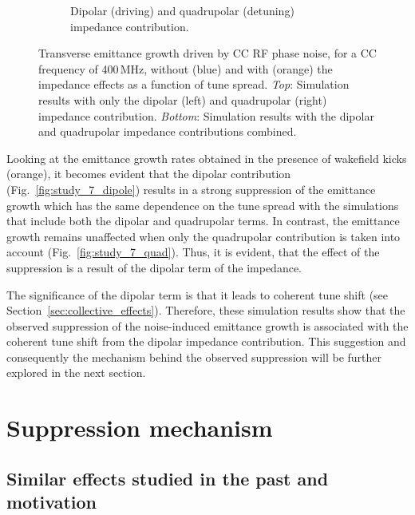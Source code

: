 \begin{figure}[htp]
\begin{subfigure}{.45\textwidth}
        \caption{Dipolar (driving) and quadrupolar (detuning) impedance contribution.}
        \label{fig:study_7_dipole_and_quad}
    \end{subfigure}   
    \caption{Transverse emittance growth driven by CC RF phase noise, for a CC frequency of 400\,MHz, without (blue) and with (orange) the impedance effects as a function of tune spread. \textit{Top}: Simulation results with only the dipolar (left) and quadrupolar (right) impedance contribution. \textit{Bottom}: Simulation results with the dipolar and quadrupolar impedance contributions combined.}
    \label{fig:study_7_dipole_vs_quadrupole}
\end{figure}

Looking at the emittance growth rates obtained in the presence of wakefield kicks (orange), it becomes evident that the dipolar contribution (Fig.~\ref{fig:study_7_dipole}) results in a strong suppression of the emittance growth which has the same dependence on the tune spread with the simulations that include both the dipolar and quadrupolar terms. In contrast, the emittance growth remains unaffected when only the quadrupolar contribution is taken into account (Fig.~\ref{fig:study_7_quad}). Thus, it is evident, that the effect of the suppression is a result of the dipolar term of the impedance. 

The significance of the dipolar term is that it leads to coherent tune shift (see Section~\ref{sec:collective_effects}). Therefore, these simulation results show that the observed suppression of the noise-induced emittance growth is associated with the coherent tune shift from the dipolar impedance contribution. This suggestion and consequently the mechanism behind the observed suppression will be further explored in the next section.


\section{Suppression mechanism}\label{sec:suppression_mechanism}


\subsection{Similar effects studied in the past and motivation}\label{subsec:past_studies_impedance_suppression_BB}

